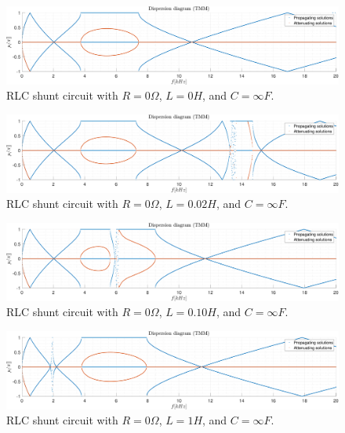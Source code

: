 \begin{figure}[H]
    \centering
    \includegraphics[width=\textwidth]{./img/MATLAB/TMM_ON-ON-ON_RLC_R0_L0_CInf.pdf}
    \caption{RLC shunt circuit with $R = 0 \Omega$, $L = 0 H$, and $C = \infty F$.}
    \label{fig:TMM_ON-ON-ON_RLC_R0_L0_CInf.pdf}
\end{figure}

\begin{figure}[H]
    \centering
    \includegraphics[width=\textwidth]{./img/MATLAB/TMM_ON-ON-ON_RLC_R0_L0.02_CInf.pdf}
    \caption{RLC shunt circuit with $R = 0 \Omega$, $L = 0.02 H$, and $C = \infty F$.}
    \label{fig:TMM_ON-ON-ON_RLC_R0_L0.02_CInf.pdf}
\end{figure}

\begin{figure}[H]
    \centering
    \includegraphics[width=\textwidth]{./img/MATLAB/TMM_ON-ON-ON_RLC_R0_L0.1_CInf.pdf}
    \caption{RLC shunt circuit with $R = 0 \Omega$, $L = 0.10 H$, and $C = \infty F$.}
    \label{fig:TMM_ON-ON-ON_RLC_R0_L0.1_CInf.pdf}
\end{figure}

\begin{figure}[H]
    \centering
    \includegraphics[width=\textwidth]{./img/MATLAB/TMM_ON-ON-ON_RLC_R0_L1_CInf.pdf}
    \caption{RLC shunt circuit with $R = 0 \Omega$, $L = 1 H$, and $C = \infty F$.}
    \label{fig:TMM_ON-ON-ON_RLC_R0_L1_CInf.pdf}
\end{figure}

